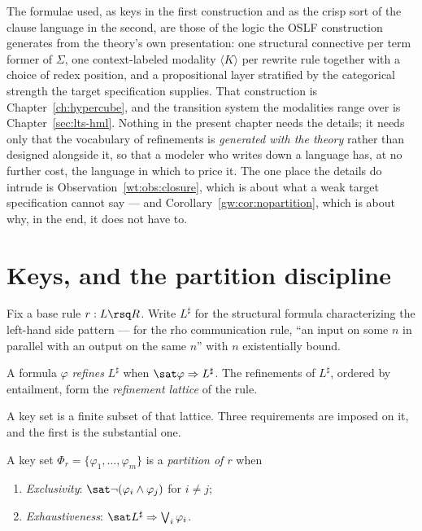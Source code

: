 \begin{remark}
\label{wt:rmk:whence}
The formulae used, as keys in the first construction and as the crisp sort of the
clause language in the second, are those of the logic the OSLF construction generates
from the theory's own presentation: one structural connective per term former of
$\Sigma$, one context-labeled modality $\langle K \rangle$ per rewrite rule together with
a choice of redex position, and a propositional layer stratified by the categorical
strength the target specification supplies. That construction is
Chapter~\ref{ch:hypercube}, and the transition system the modalities range over is
Chapter~\ref{sec:lts-hml}. Nothing in the present chapter needs the details; it needs
only that the vocabulary of refinements is \emph{generated with the theory} rather than
designed alongside it, so that a modeler who writes down a language has, at no further
cost, the language in which to price it. The one place the details do intrude is
Observation~\ref{wt:obs:closure}, which is about what a weak target specification cannot
say --- and Corollary~\ref{gw:cor:nopartition}, which is about why, in the end, it does
not have to.
\end{remark}

\section{Keys, and the partition discipline}
\label{wt:sec:partition}

Fix a base rule $r : L \rsq R$. Write $L^{\sharp}$ for the structural formula
characterizing the left-hand side pattern --- for the rho communication rule, ``an input
on some $n$ in parallel with an output on the same $n$'' with $n$ existentially bound.

\begin{definition}[Refinement]
\label{wt:def:refinement}
A formula $\varphi$ \emph{refines} $L^{\sharp}$ when $\sat \varphi \Rightarrow L^{\sharp}$.
The refinements of $L^{\sharp}$, ordered by entailment, form the \emph{refinement lattice}
of the rule.
\end{definition}

A key set is a finite subset of that lattice. Three requirements are imposed on it, and
the first is the substantial one.

\begin{definition}
\label{wt:def:partition}
A key set $\Phi_r = \{\varphi_1, \ldots, \varphi_m\}$ is a \emph{partition of $r$} when
\begin{enumerate}[label=(P\arabic*),leftmargin=3em]
  \item \emph{Exclusivity}: $\sat \neg(\varphi_i \wedge \varphi_j)$ for $i \neq j$;
  \item \emph{Exhaustiveness}: $\sat L^{\sharp} \Rightarrow \bigvee_i \varphi_i$.
\end{enumerate}
\end{definition}


